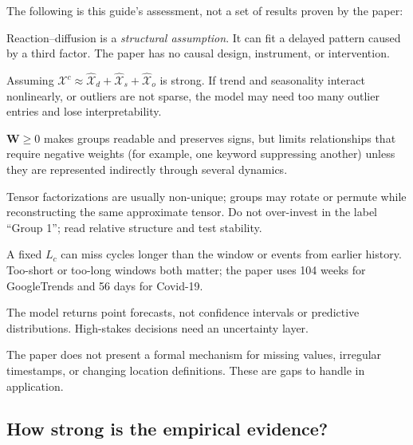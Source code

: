 The following is this guide's assessment, not a set of results proven by the paper:

\begin{description}[leftmargin=1.8em,style=nextline]
  \item[Interpretation is not causation.] Reaction--diffusion is a \emph{structural assumption}. It can
  fit a delayed pattern caused by a third factor. The paper has no causal design, instrument, or
  intervention.
  \item[Additive three-part model.] Assuming
  $\mathcal{X}^{c}\approx\widehat{\mathcal{X}}_d+\widehat{\mathcal{X}}_s+\widehat{\mathcal{X}}_o$
  is strong. If trend and seasonality
  interact nonlinearly, or outliers are not sparse, the model may need too many outlier entries and
  lose interpretability.
  \item[Non-negative factors.] $\mathbf{W}\ge0$ makes groups readable and preserves signs, but limits
  relationships that require negative weights (for example, one keyword suppressing another) unless
  they are represented indirectly through several dynamics.
  \item[Non-identifiability.] Tensor factorizations are usually non-unique; groups may rotate or
  permute while reconstructing the same approximate tensor. Do not over-invest in the label ``Group
  1''; read relative structure and test stability.
  \item[Fixed window.] A fixed $L_c$ can miss cycles longer than the window or events from earlier
  history. Too-short or too-long windows both matter; the paper uses 104 weeks for GoogleTrends and 56
  days for Covid-19.
  \item[No uncertainty.] The model returns point forecasts, not confidence intervals or predictive
  distributions. High-stakes decisions need an uncertainty layer.
  \item[Missing/irregular data.] The paper does not present a formal mechanism for missing values,
  irregular timestamps, or changing location definitions. These are gaps to handle in application.
\end{description}

\subsection{How strong is the empirical evidence?}

